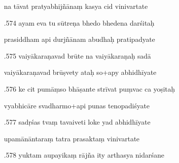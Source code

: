 \documentclass[article,12pt,a4paper]{memoir}%
\newcounter{parCount}
\begin{document}
	  
	  \pstart \leavevmode%
	na tāvat pratyabhijñānaṃ kasya cid vinivartate 
	{}
	\pend%
      

	  
	  \pstart {}.574 ayam eva tu sūtreṇa bhedo bhedena darśitaḥ 
	{}
	\pend%
      

	  
	  \pstart \leavevmode%
	prasiddham api durjñānam abudhaḥ pratipadyate 
	{}
	\pend%
      

	  
	  \pstart {}.575 vaiyākaraṇavad brūte na vaiyākaraṇaḥ sadā 
	{}
	\pend%
      

	  
	  \pstart \leavevmode%
	vaiyākaraṇavad brūṣvety ataḥ so+apy abhidhīyate 
	{}
	\pend%
      

	  
	  \pstart {}.576 ke cit pumāṃso bhāṣante strīvat puṃvac ca yoṣitaḥ 
	{}
	\pend%
      

	  
	  \pstart \leavevmode%
	vyabhicāre svadharmo+api punas tenopadiśyate 
	{}
	\pend%
      

	  
	  \pstart {}.577 sadṛśas tvaṃ tavaiveti loke yad abhidhīyate 
	{}
	\pend%
      

	  
	  \pstart \leavevmode%
	upamānāntaraṃ tatra prasaktaṃ vinivartate 
	{}
	\pend%
      

	  
	  \pstart {}.578 yuktam aupayikaṃ rājña ity arthasya nidarśane 
	{}
	\pend%
      
\end{document}
